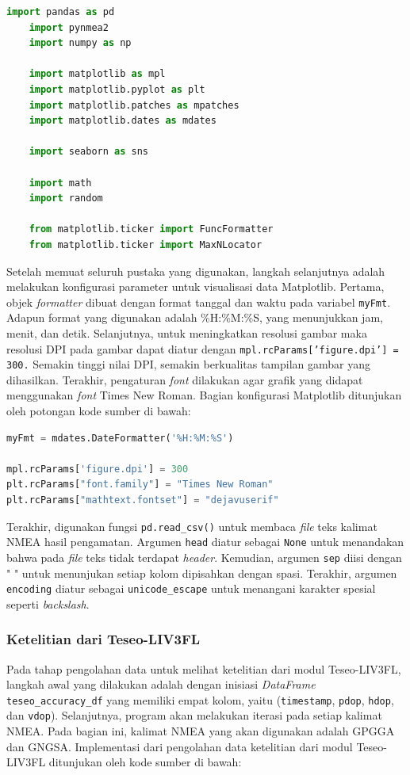 \begin{lstlisting}[language=python]
	import pandas as pd
	import pynmea2
	import numpy as np
	
	import matplotlib as mpl
	import matplotlib.pyplot as plt
	import matplotlib.patches as mpatches
	import matplotlib.dates as mdates
	
	import seaborn as sns
	
	import math
	import random
	
	from matplotlib.ticker import FuncFormatter
	from matplotlib.ticker import MaxNLocator
\end{lstlisting}

Setelah memuat seluruh pustaka yang digunakan, langkah selanjutnya adalah melakukan konfigurasi parameter untuk visualisasi data Matplotlib. Pertama, objek \textit{formatter} dibuat dengan format tanggal dan waktu pada variabel \texttt{myFmt}. Adapun format yang digunakan adalah \%H:\%M:\%S, yang menunjukkan jam, menit, dan detik. Selanjutnya, untuk meningkatkan resolusi gambar maka resolusi DPI pada gambar dapat diatur dengan \texttt{mpl.rcParams['figure.dpi'] = 300.} Semakin tinggi nilai DPI, semakin berkualitas tampilan gambar yang dihasilkan. Terakhir, pengaturan \textit{font} dilakukan agar grafik yang didapat menggunakan \textit{font} Times New Roman. Bagian konfigurasi Matplotlib ditunjukan oleh potongan kode sumber di bawah:

\begin{lstlisting}[language=python]
myFmt = mdates.DateFormatter('%H:%M:%S') 

mpl.rcParams['figure.dpi'] = 300
plt.rcParams["font.family"] = "Times New Roman"
plt.rcParams["mathtext.fontset"] = "dejavuserif"
\end{lstlisting}

Terakhir, digunakan fungsi \texttt{pd.read\_csv()} untuk membaca \textit{file} teks kalimat NMEA hasil pengamatan. Argumen \texttt{head} diatur sebagai \texttt{None} untuk menandakan bahwa pada \textit{file} teks tidak terdapat \textit{header}. Kemudian, argumen \texttt{sep} diisi dengan " 
" untuk menunjukan setiap kolom dipisahkan dengan spasi. Terakhir, argumen \texttt{encoding} diatur sebagai \texttt{unicode\_escape} untuk menangani karakter spesial seperti \textit{backslash}.

\subsubsection{Ketelitian dari Teseo-LIV3FL}
Pada tahap pengolahan data untuk melihat ketelitian dari modul Teseo-LIV3FL, langkah awal yang dilakukan adalah dengan inisiasi \textit{DataFrame} \texttt{teseo\_accuracy\_df} yang memiliki empat kolom, yaitu (\texttt{timestamp}, \texttt{pdop}, \texttt{hdop}, dan \texttt{vdop}). Selanjutnya, program akan melakukan iterasi pada setiap kalimat NMEA. Pada bagian ini, kalimat NMEA yang akan digunakan adalah GPGGA dan GNGSA. Implementasi dari pengolahan data ketelitian dari modul Teseo-LIV3FL ditunjukan oleh kode sumber di bawah:

